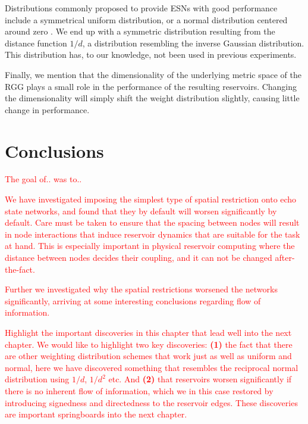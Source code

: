 Distributions commonly proposed to provide ESNs with good performance include a
symmetrical uniform distribution, or a normal distribution centered around zero
\cite{montavon_practical_2012}. We end up with a symmetric distribution
resulting from the distance function $1/d$, a distribution resembling the
inverse Gaussian distribution. This distribution has, to our knowledge, not been
used in previous experiments.

Finally, we mention that the dimensionality of the underlying metric space of
the RGG plays a small role in the performance of the resulting
reservoirs. Changing the dimensionality will simply shift the weight
distribution slightly, causing little change in performance.

\section{Conclusions}

\textcolor{red}{
  The goal of.. was to..
}

\textcolor{red}{
  We have investigated imposing the simplest type of spatial restriction onto
echo state networks, and found that they by default will worsen significantly by
default. Care must be taken to ensure that the spacing between nodes will result
in node interactions that induce reservoir dynamics that are suitable for the
task at hand. This is especially important in physical reservoir computing where
the distance between nodes decides their coupling, and it can not be changed
after-the-fact.
}

\textcolor{red}{
  Further we investigated why the spatial restrictions worsened the networks
significantly, arriving at some interesting conclusions regarding flow of
information.
}

\textcolor{red}{
  Highlight the important discoveries in this chapter that lead well into the
next chapter. We would like to highlight two key discoveries: \textbf{(1)} the
fact that there are other weighting distribution schemes that work just as well
as uniform and normal, here we have discovered something that resembles the
reciprocal normal distribution using $1/d$, $1/d^2$ etc. And \textbf{(2)} that
reservoirs worsen significantly if there is no inherent flow of information,
which we in this case restored by introducing signedness and directedness to the
reservoir edges. These discoveries are important springboards into the next
chapter.
}


